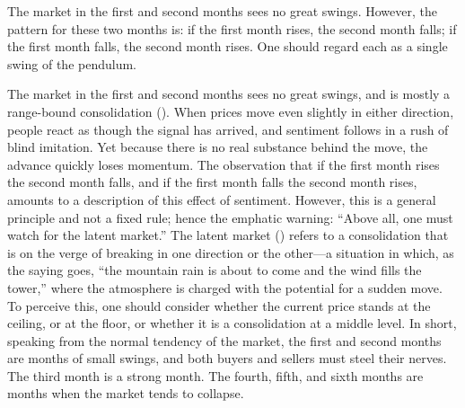 
\begin{sokyubox}
{\small\itshape\color{sokyubar} }

\medskip
The market in the first and second months sees no great swings.
However, the pattern for these two months is: if the first
month rises, the second month falls; if the first month falls, the
second month rises. One should regard each as a single swing of
the pendulum.
\end{sokyubox}

\commentary
The market in the first and second months sees no great swings, and
is mostly a range-bound consolidation ().
When prices move even slightly in either direction, people react
as though the signal has arrived, and sentiment follows in a rush
of blind imitation. Yet because there is no real substance behind
the move, the advance quickly loses momentum. The observation
that if the first month rises the second month falls, and if the
first month falls the second month rises, amounts to a description
of this effect of sentiment. However, this is a general principle
and not a fixed rule; hence the emphatic warning: ``Above all, one
must watch for the latent market.'' The latent market
() refers to a
consolidation that is on the verge of breaking in one direction
or the other---a situation in which, as the saying goes, ``the
mountain rain is about to come and the wind fills the tower,'' where
the atmosphere is charged with the potential for a sudden move.
To perceive this, one should consider whether the current price
stands at the ceiling, or at the floor, or whether it is a
consolidation at a middle level. In short, speaking from the
normal tendency of the market, the first and second months are
months of small swings, and both buyers and sellers must steel
their nerves. The third month is a strong month. The fourth, fifth,
and sixth months are months when the market tends to collapse.


